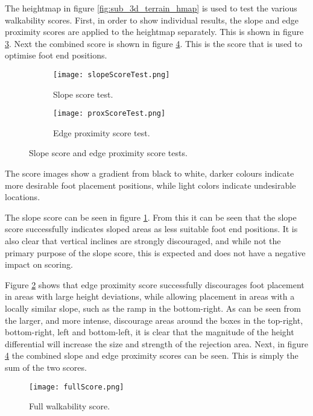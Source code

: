    \noindent
    The heightmap in figure \ref{fig:sub_3d_terrain_hmap} is used to test the various walkability scores. First, in order to show individual results, the slope and edge proximity scores are applied to the heightmap separately. This is shown in figure \ref{fig:scores_seperate}. Next the combined score is shown in figure \ref{fig:full_score}. This is the score that is used to optimise foot end positions.
    \begin{figure}[h]
        \centering
        \begin{subfigure}{.45\textwidth}
            \texttt{[image: slopeScoreTest.png]}
            \caption{Slope score test.}
            \label{fig:sub_slope_test}
        \end{subfigure}%
        \begin{subfigure}{.45\textwidth}
            \texttt{[image: proxScoreTest.png]}
            \caption{Edge proximity score test.}
            \label{fig:sub_prox_test}
        \end{subfigure}
        \caption{Slope score and edge proximity score tests.}
        \label{fig:scores_seperate}
    \end{figure}
    The score images show a gradient from black to white, darker colours indicate more desirable foot placement positions, while light colors indicate undesirable locations.

    The slope score can be seen in figure \ref{fig:sub_slope_test}. From this it can be seen that the slope score successfully indicates sloped areas
    as less suitable foot end positions. It is also clear that vertical inclines are strongly discouraged, and while not the primary purpose of the slope
    score, this is expected and does not have a negative impact on scoring.

    Figure \ref{fig:sub_prox_test} shows that edge proximity score successfully discourages foot placement in areas with large height deviations,
    while allowing placement in areas with a locally similar slope, such as the ramp in the bottom-right. As can be seen from the larger, and more intense, discourage areas around the boxes in the
    top-right, bottom-right, left and bottom-left, it is clear that the magnitude of the height differential will increase the size and strength of the rejection area.
    Next, in figure \ref{fig:full_score} the combined slope and edge proximity scores can be seen. This is simply the sum of the two scores.
    \begin{figure}[h]
        \centering
        \texttt{[image: fullScore.png]}
        \caption{Full walkability score.}
        \label{fig:full_score}
    \end{figure}

